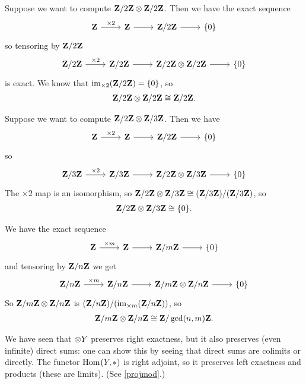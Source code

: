 \documentclass[11pt, oneside,margin=1in]{article}
\begin{document}
\begin{example}\label{}
Suppose we want to compute $\mathbf Z / 2\mathbf Z\otimes \mathbf Z / 2\mathbf Z$. Then we have the exact sequence 
\[
\begin{tikzcd}
\Z \arrow[r, "\times 2"] & \Z\arrow[r]& \Zmod 2\arrow[r] & \{0\}
\end{tikzcd}
\]
so tensoring by $\mathbf Z / 2\mathbf Z$ 
\[
\begin{tikzcd}
\Zmod 2 \arrow[r,"\times 2"] & \Zmod 2\arrow[r]& \Zmod 2\tensor \Zmod 2\arrow[r] & \{0\}
\end{tikzcd}
\]
is exact. We know that $\operatorname{im}_{\times 2}(\mathbf Z / 2\mathbf Z)=\{0\}$, so \begin{align*}
	\mathbf Z / 2\mathbf Z\otimes \mathbf Z / 2\mathbf Z \cong \mathbf Z / 2\mathbf Z.
\end{align*}

Suppose we want to compute $\mathbf Z / 2\mathbf Z\otimes \mathbf Z / 3\mathbf Z$. Then we have 
\[
\begin{tikzcd}
\Z \arrow[r, "\times 2"] & \Z\arrow[r]& \Zmod 2\arrow[r] & \{0\}
\end{tikzcd}
\]
so
\[
\begin{tikzcd}
\Zmod 3 \arrow[r,"\times 2"] & \Zmod 3\arrow[r]& \Zmod 2\tensor \Zmod 3\arrow[r] & \{0\}
\end{tikzcd}
\]
The $\times 2$ map is an isomorphism, so $\mathbf Z / 2\mathbf Z\otimes \mathbf Z / 3\mathbf Z \cong (\mathbf Z / 3\mathbf Z)/ (\mathbf Z / 3\mathbf Z)$, so 
\begin{align*}
	\mathbf Z / 2\mathbf Z\otimes\mathbf Z / 3\mathbf Z\cong \{0\}.
\end{align*}
\end{example}
\begin{example}\label{}
We have the exact sequence
\[
\begin{tikzcd}
  \Z \arrow[r, "\times m"] & \Z\arrow[r]& \Zmod m\arrow[r] & \{0\}
\end{tikzcd}
\]
and tensoring by $\mathbf Z / n\mathbf Z$ we get 
\[
\begin{tikzcd}
\Zmod n \arrow[r,"\times m"] & \Zmod n\arrow[r]& \Zmod m\tensor \Zmod n\arrow[r] & \{0\}
\end{tikzcd}
\]
So $\mathbf Z / m\mathbf Z\otimes \mathbf Z / n\mathbf Z$ is $ (\mathbf Z / n\mathbf Z) / (\operatorname{im}_{\times m} (\mathbf Z / n\mathbf Z))$, so
\begin{align*}
	\mathbf Z / m\mathbf Z\otimes \mathbf Z / n\mathbf Z \cong \mathbf Z / \gcd(n,m)\mathbf Z. 
\end{align*}
\end{example}

We have seen that $\otimes Y$ preserves right exactness, but it also preserves (even infinite) direct sums: one can show this by seeing that direct sums are colimits or directly. The functor $\operatorname{Hom}_{}(Y, *)$ is right adjoint, so it preserves left exactness and products (these are limits). (See \cref{projmod}.) 
\end{document}
